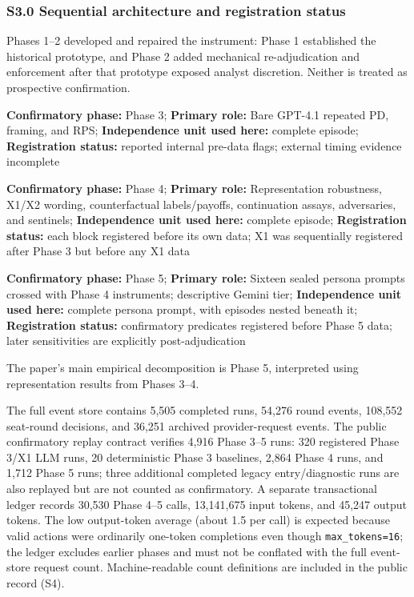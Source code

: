 \documentclass[11pt]{article}
\begin{document}
\subsubsection{S3.0 Sequential architecture and registration
status}\label{s3.0-sequential-architecture-and-registration-status}

Phases 1--2 developed and repaired the instrument: Phase 1 established
the historical prototype, and Phase 2 added mechanical re-adjudication
and enforcement after that prototype exposed analyst discretion. Neither
is treated as prospective confirmation.

\textbf{Confirmatory phase:} Phase 3; \textbf{Primary role:} Bare
GPT-4.1 repeated PD, framing, and RPS; \textbf{Independence unit used
here:} complete episode; \textbf{Registration status:} reported internal
pre-data flags; external timing evidence incomplete

\textbf{Confirmatory phase:} Phase 4; \textbf{Primary role:}
Representation robustness, X1/X2 wording, counterfactual labels/payoffs,
continuation assays, adversaries, and sentinels; \textbf{Independence
unit used here:} complete episode; \textbf{Registration status:} each
block registered before its own data; X1 was sequentially registered
after Phase 3 but before any X1 data

\textbf{Confirmatory phase:} Phase 5; \textbf{Primary role:} Sixteen
sealed persona prompts crossed with Phase 4 instruments; descriptive
Gemini tier; \textbf{Independence unit used here:} complete persona
prompt, with episodes nested beneath it; \textbf{Registration status:}
confirmatory predicates registered before Phase 5 data; later
sensitivities are explicitly post-adjudication

The paper's main empirical decomposition is Phase 5, interpreted using
representation results from Phases 3--4.

The full event store contains 5,505 completed runs, 54,276 round events,
108,552 seat-round decisions, and 36,251 archived provider-request
events. The public confirmatory replay contract verifies 4,916 Phase
3--5 runs: 320 registered Phase 3/X1 LLM runs, 20 deterministic Phase 3
baselines, 2,864 Phase 4 runs, and 1,712 Phase 5 runs; three additional
completed legacy entry/diagnostic runs are also replayed but are not
counted as confirmatory. A separate transactional ledger records 30,530
Phase 4--5 calls, 13,141,675 input tokens, and 45,247 output tokens. The
low output-token average (about 1.5 per call) is expected because valid
actions were ordinarily one-token completions even though
\texttt{max\_tokens=16}; the ledger excludes earlier phases and must not
be conflated with the full event-store request count. Machine-readable
count definitions are included in the public record (S4).
\end{document}
